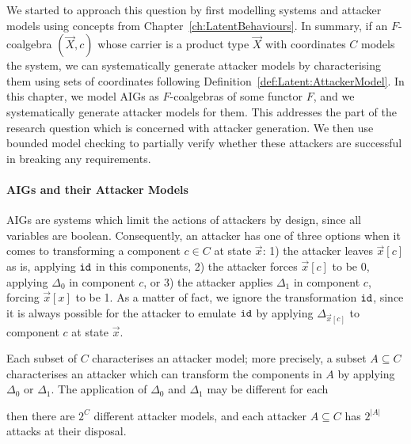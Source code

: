 We started to approach this question by first modelling systems and attacker models using concepts from Chapter~\ref{ch:LatentBehaviours}. In summary, if an $F$-coalgebra $(\vec{X},c)$ whose carrier is a product type $\vec{X}$ with coordinates $C$ models the system, we can systematically generate attacker models by characterising them using sets of coordinates following Definition~\ref{def:Latent:AttackerModel}. In this chapter, we model AIGs as $F$-coalgebras of some functor $F$, and we systematically generate attacker models for them. This addresses the part of the research question which is concerned with attacker generation. We then use bounded model checking to partially verify whether these attackers are successful in breaking any requirements.

\paragraph{AIGs and their Attacker Models} AIGs are systems which limit the actions of attackers by design, since all variables are boolean. Consequently, an attacker has one of three options when it comes to transforming a component $c\in C$ at state $\vec{x}$: 1) the attacker leaves $\vec{x}[c]$ as is, applying ${\texttt{id}}$ in this components, 2) the attacker forces $\vec{x}[c]$ to be 0, applying $\Delta_0$ in component $c$, or 3) the attacker applies $\Delta_1$ in component $c$, forcing $\vec{x}[x]$ to be 1. As a matter of fact, we ignore the transformation ${\texttt{id}}$, since it is always possible for the attacker to emulate ${\texttt{id}}$ by applying $\Delta_{\vec{x}[c]}$ to component $c$ at state $\vec{x}$.

Each subset of $C$ characterises an attacker model; more precisely, a subset $A\subseteq C$ characterises an attacker which can transform the components in $A$ by applying $\Delta_0$ or $\Delta_1$. The application of $\Delta_0$ and $\Delta_1$ may be different for each 

then there are $2^C$ different attacker models, and each attacker $A\subseteq C$ has $2^{|A|}$ attacks at their disposal. 



